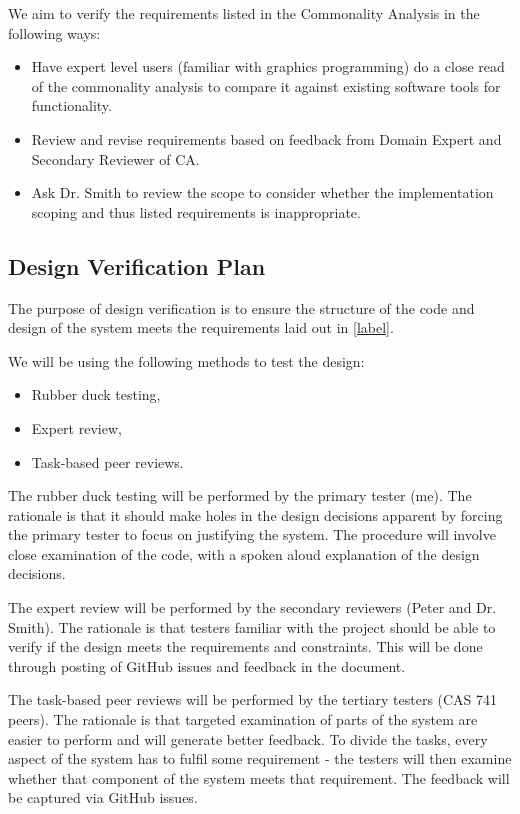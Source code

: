 \documentclass[12pt, titlepage]{article}
\begin{document}
We aim to verify the requirements listed in the Commonality Analysis in the 
following ways:

\begin{itemize}
	\item Have expert level users (familiar with graphics programming) do a 
	close read of the commonality analysis to compare it against existing 
	software tools for functionality.
	\item Review and revise requirements based on feedback from Domain Expert 
	and Secondary Reviewer of CA.
	\item Ask Dr. Smith to review the scope to consider whether the 
	implementation scoping and thus listed requirements is inappropriate.
\end{itemize}

\subsection{Design Verification Plan}
The purpose of design verification is to ensure the structure of the code and 
design of the system meets the requirements laid out in \ref{label}.

We will be using the following methods to test the design:

\begin{itemize}
	\item Rubber duck testing,
	\item Expert review,
	\item Task-based peer reviews.
\end{itemize}

The rubber duck testing will be performed by the primary tester (me). The 
rationale is that it should make holes in the design decisions apparent by 
forcing the primary tester to focus on justifying the system. The procedure 
will involve close examination of the code, with a spoken aloud explanation of 
the design decisions.

The expert review will be performed by the secondary reviewers (Peter and Dr. 
Smith). The rationale is that testers familiar with the project should be able 
to verify if the design meets the requirements and constraints. This will be 
done through posting of GitHub issues and feedback in the document.

The task-based peer reviews will be performed by the tertiary testers (CAS 741 
peers). The rationale is that targeted examination of parts of the system are 
easier to perform and will generate better feedback. To divide the tasks, every 
aspect of the system has to fulfil some requirement - the testers will then 
examine whether that component of the system meets that requirement. The 
feedback will be captured via GitHub issues.
\end{document}
